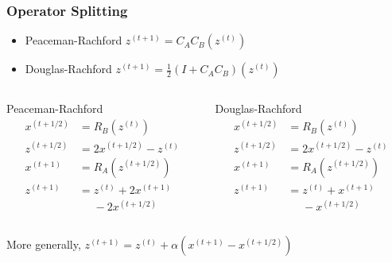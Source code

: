\begin{frame}
\frametitle{Operator Splitting}

\begin{itemize}
    \item Peaceman-Rachford $z^{(t+1)} = C_A C_B(z^{(t)})$
    \item Douglas-Rachford $z^{(t+1)} = \frac12(I + C_A C_B)(z^{(t)})$
\end{itemize}

\begin{columns}
\begin{column}{0.4\textwidth}
\begin{block}{Peaceman-Rachford}
\ 
\vspace{-1.3em}
\begin{align*}
x^{(t+1/2)} & = R_B(z^{(t)}) \\
z^{(t+1/2)} & = 2x^{(t+1/2)} - z^{(t)} \\
x^{(t+1)} & = R_A(z^{(t+1/2)}) \\
z^{(t+1)} & = z^{(t)} + 2x^{(t+1)} \\
& \phantom{=} - 2x^{(t+1/2)}
\end{align*}
\end{block}
\end{column}
\begin{column}{0.4\textwidth}
\begin{block}{Douglas-Rachford}
\ 
\vspace{-1.3em}
\begin{align*}
x^{(t+1/2)} & = R_B(z^{(t)}) \\
z^{(t+1/2)} & = 2x^{(t+1/2)} - z^{(t)} \\
x^{(t+1)} & = R_A(z^{(t+1/2)}) \\
z^{(t+1)} & = z^{(t)} + x^{(t+1)} \\
& \phantom{=} - x^{(t+1/2)}
\end{align*}
\end{block}
\end{column}
\end{columns}

More generally, $z^{(t+1)} = z^{(t)} + \alpha (x^{(t+1)} - x^{(t+1/2)})$

\end{frame}


